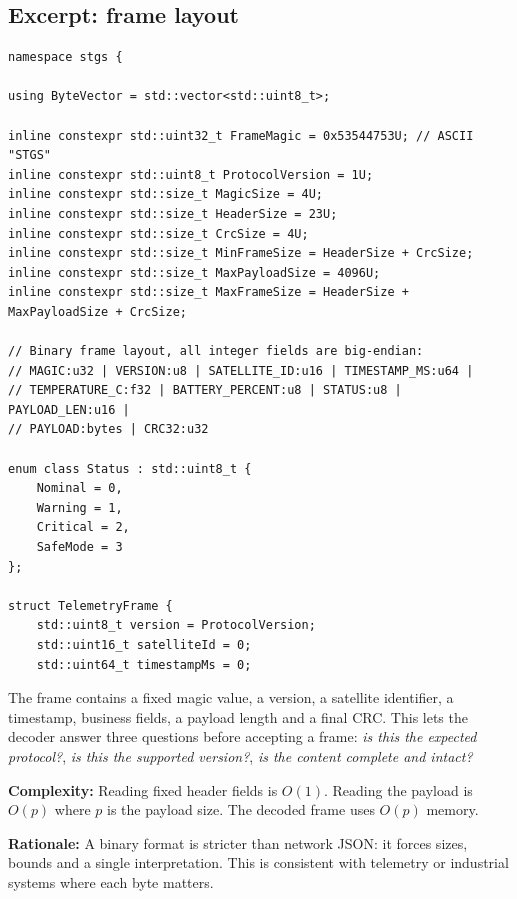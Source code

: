 \documentclass[10pt,a4paper]{article}
\newcommand{\complexity}[1]{\textbf{Complexity:} #1}
\newcommand{\rationale}[1]{\textbf{Rationale:} #1}
\begin{document}
\subsection{Excerpt: frame layout}
\begin{lstlisting}[caption={Binary frame layout and protocol constants}]
namespace stgs {

using ByteVector = std::vector<std::uint8_t>;

inline constexpr std::uint32_t FrameMagic = 0x53544753U; // ASCII "STGS"
inline constexpr std::uint8_t ProtocolVersion = 1U;
inline constexpr std::size_t MagicSize = 4U;
inline constexpr std::size_t HeaderSize = 23U;
inline constexpr std::size_t CrcSize = 4U;
inline constexpr std::size_t MinFrameSize = HeaderSize + CrcSize;
inline constexpr std::size_t MaxPayloadSize = 4096U;
inline constexpr std::size_t MaxFrameSize = HeaderSize + MaxPayloadSize + CrcSize;

// Binary frame layout, all integer fields are big-endian:
// MAGIC:u32 | VERSION:u8 | SATELLITE_ID:u16 | TIMESTAMP_MS:u64 |
// TEMPERATURE_C:f32 | BATTERY_PERCENT:u8 | STATUS:u8 | PAYLOAD_LEN:u16 |
// PAYLOAD:bytes | CRC32:u32

enum class Status : std::uint8_t {
    Nominal = 0,
    Warning = 1,
    Critical = 2,
    SafeMode = 3
};

struct TelemetryFrame {
    std::uint8_t version = ProtocolVersion;
    std::uint16_t satelliteId = 0;
    std::uint64_t timestampMs = 0;
\end{lstlisting}


The frame contains a fixed magic value, a version, a satellite identifier, a timestamp, business fields, a payload length and a final CRC. This lets the decoder answer three questions before accepting a frame: \textit{is this the expected protocol?}, \textit{is this the supported version?}, \textit{is the content complete and intact?}

\complexity{Reading fixed header fields is $O(1)$. Reading the payload is $O(p)$ where $p$ is the payload size. The decoded frame uses $O(p)$ memory.}

\rationale{A binary format is stricter than network JSON: it forces sizes, bounds and a single interpretation. This is consistent with telemetry or industrial systems where each byte matters.}
\end{document}
